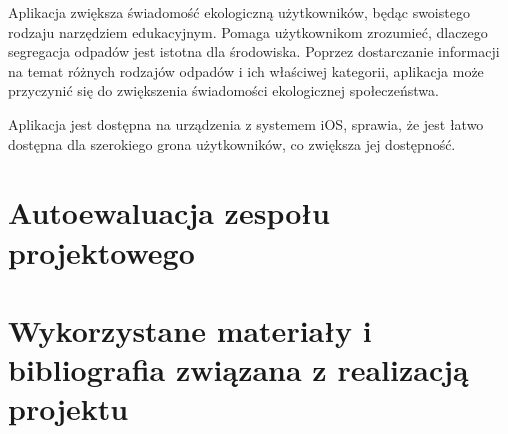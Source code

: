 \documentclass[12pt, a4paper, twoside, openany]{book}
\begin{document}
Aplikacja zwiększa świadomość ekologiczną użytkowników, będąc swoistego rodzaju narzędziem edukacyjnym. Pomaga użytkownikom zrozumieć, dlaczego segregacja odpadów jest istotna dla środowiska.
Poprzez dostarczanie informacji na temat różnych rodzajów odpadów i ich właściwej kategorii, aplikacja może przyczynić się do zwiększenia świadomości ekologicznej społeczeństwa.

Aplikacja jest dostępna na urządzenia z systemem iOS, sprawia, że jest łatwo dostępna dla szerokiego grona użytkowników, co zwiększa jej dostępność.

\section{Autoewaluacja zespołu projektowego}

\section{Wykorzystane materiały i bibliografia związana z realizacją projektu}
\end{document}
